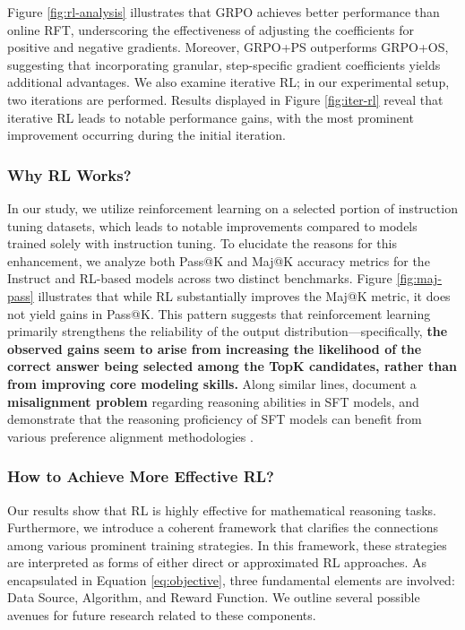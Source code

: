 \begin{itemize}[topsep=0pt]
\begin{itemize}[topsep=0pt]
Figure \ref{fig:rl-analysis} illustrates that GRPO achieves better performance than online RFT, underscoring the effectiveness of adjusting the coefficients for positive and negative gradients. Moreover, GRPO+PS outperforms GRPO+OS, suggesting that incorporating granular, step-specific gradient coefficients yields additional advantages. We also examine iterative RL; in our experimental setup, two iterations are performed. Results displayed in Figure \ref{fig:iter-rl} reveal that iterative RL leads to notable performance gains, with the most prominent improvement occurring during the initial iteration.

\subsubsection{Why RL Works?} In our study, we utilize reinforcement learning on a selected portion of instruction tuning datasets, which leads to notable improvements compared to models trained solely with instruction tuning. To elucidate the reasons for this enhancement, we analyze both Pass@K and Maj@K accuracy metrics for the Instruct and RL-based models across two distinct benchmarks. Figure \ref{fig:maj-pass} illustrates that while RL substantially improves the Maj@K metric, it does not yield gains in Pass@K. This pattern suggests that reinforcement learning primarily strengthens the reliability of the output distribution—specifically, \textbf{the observed gains seem to arise from increasing the likelihood of the correct answer being selected among the TopK candidates, rather than from improving core modeling skills.} Along similar lines, \citep{wang2023making} document a \textbf{misalignment problem} regarding reasoning abilities in SFT models, and demonstrate that the reasoning proficiency of SFT models can benefit from various preference alignment methodologies \citep{yuan2023rrhf,song2023preference,wang2023making}.

\subsubsection{How to Achieve More Effective RL?}
\label{sec:effec_rl}
Our results show that RL is highly effective for mathematical reasoning tasks. Furthermore, we introduce a coherent framework that clarifies the connections among various prominent training strategies. In this framework, these strategies are interpreted as forms of either direct or approximated RL approaches. As encapsulated in Equation \ref{eq:objective}, three fundamental elements are involved: Data Source, Algorithm, and Reward Function. We outline several possible avenues for future research related to these components.


\end{itemize}
\end{itemize}
